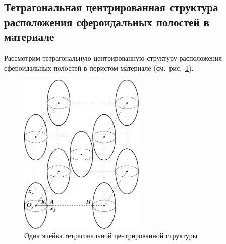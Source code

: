 \subsection{Тетрагональная центрированная структура расположения сфероидальных полостей в материале}

Рассмотрим тетрагональную центрированную структуру расположения сфероидальных полостей в пористом материале (см.~рис.~\ref{f:9:42}).

\begin{figure}[h!]
\centering
\includegraphics[width=6cm]{cav-9.pdf}
\caption{Одна ячейка тетрагональной центрированной структуры}
\label{f:9:42}
\end{figure}

